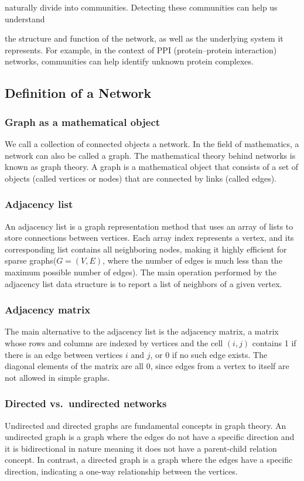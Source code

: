 naturally divide into communities. Detecting these communities can help us understand 

the structure and function of the network, as well as the underlying system it represents.
For example, in the context of PPI (protein–protein interaction) networks, communities can help identify 
unknown protein complexes.

\subsection{Definition of a Network}
\subsubsection{Graph as  a mathematical object}
We call a collection of connected objects a network. In the field of mathematics,
a network can also be called a graph. The mathematical theory behind networks is known as graph theory.
A graph is a mathematical object that consists of a set of objects (called vertices or nodes) that are
connected by links (called edges).

\subsubsection{Adjacency list}

An adjacency list is a graph representation method that uses an array of lists to store connections between vertices. 
Each array index represents a vertex, and its corresponding list contains all 
neighboring nodes, making it highly efficient for sparse graphs($G= (V,E)$, where the number
of edges is much less than the maximum possible number of edges).
The main operation performed by the adjacency list data structure is to report a list of neighbors
of a given vertex.

\subsubsection{Adjacency matrix}
The main alternative to the adjacency list is the adjacency matrix,
a matrix whose rows and columns are indexed by vertices and the cell $(i,j)$ 
contains 1 if there is an edge between vertices $i$ and $j$, or 0 if no such edge exists.
The diagonal elements of the matrix are all 0, since
edges from a vertex to itself are not allowed in simple graphs.

\subsubsection{Directed vs.\ undirected networks}
Undirected and directed graphs are fundamental concepts in graph theory.
An undirected graph is a graph where the edges do not have a specific direction and
it is bidirectional in nature meaning it does not have a parent-child relation concept.
In contrast, a directed graph is a graph where the edges have a specific direction,
indicating a one-way relationship between the vertices.

